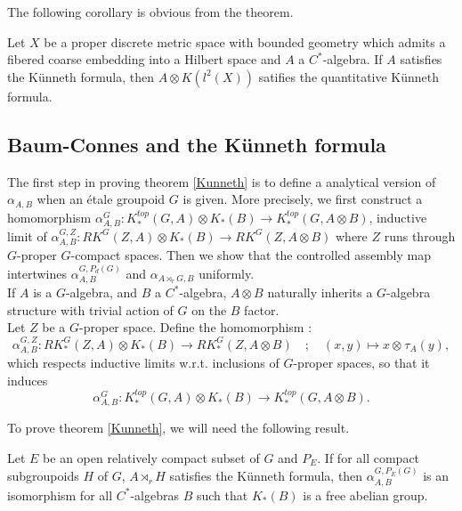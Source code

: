 The following corollary is obvious from the theorem.\cite{FinnSellFibred}

\begin{cor}
Let $X$ be a proper discrete metric space with bounded geometry which admits a fibered coarse embedding into a Hilbert space and $A$ a $C^*$-algebra. If $A$ satisfies the Künneth formula, then $A\otimes K(l^2(X))$ satifies the quantitative Künneth formula.
\end{cor}




\subsection{Baum-Connes and the Künneth formula}
The first step in proving theorem \ref{Kunneth} is to define a analytical version of $\alpha_{A,B}$ when an étale groupoid $G$ is given. More precisely, we first construct a homomorphism $\alpha_{A,B}^G : K_*^{top}(G,A)\otimes K_*(B)\rightarrow K_*^{top}(G,A\otimes B )$, inductive limit of $\alpha_{A,B}^{G,Z} : RK^G(Z,A)\otimes K_*(B)\rightarrow RK^G(Z,A\otimes B )$ where $Z$ runs through $G$-proper $G$-compact spaces. Then we show that the controlled assembly map intertwines $\alpha^{G,P_d(G)}_{A,B}$ and $\alpha_{A\rtimes_r G,B}$ uniformly.\\

If $A$ is a $G$-algebra, and $B$ a $C^*$-algebra, $A\otimes B$ naturally inherits a $G$-algebra structure with trivial action of $G$ on the $B$ factor.\\

Let $Z$ be a $G$-proper space. Define the homomorphism :
\[\alpha_{A,B}^{G,Z} : RK^G_*(Z,A)\otimes K_*(B)\rightarrow RK_*^G(Z,A\otimes B) \quad ; \quad (x,y)\mapsto x\otimes_{}   \tau_A(y),\]
which respects inductive limits w.r.t. inclusions of $G$-proper spaces, so that it induces
\[\alpha_{A,B}^G : K_*^{top}(G,A)\otimes K_*(B)\rightarrow K_*^{top}(G,A\otimes B ).\]

To prove theorem \ref{Kunneth}, we will need the following result.

\begin{thm}\label{TopologicalKunneth}
Let $E$ be an open relatively compact subset of $G$ and $P_E$. If for all compact subgroupoids $H$ of $G$, $A\rtimes_r H$ satisfies the Künneth formula, then $\alpha_{A,B}^{G,P_E(G)}$ is an isomorphism for all $C^*$-algebras $B$ such that $K_*(B)$ is a free abelian group.
\end{thm}

